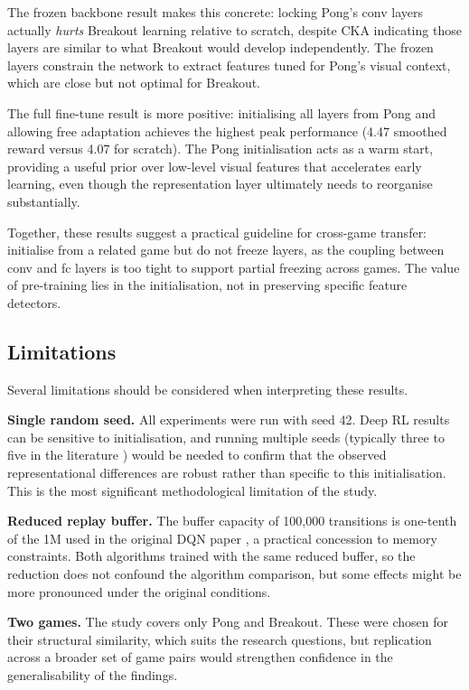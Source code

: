 \documentclass[a4paper]{article}
\begin{document}
The frozen backbone result makes this concrete: locking Pong's conv layers actually \textit{hurts} Breakout learning relative to scratch, despite CKA indicating those layers are similar to what Breakout would develop independently. The frozen layers constrain the network to extract features tuned for Pong's visual context, which are close but not optimal for Breakout.

The full fine-tune result is more positive: initialising all layers from Pong and allowing free adaptation achieves the highest peak performance (4.47 smoothed reward versus 4.07 for scratch). The Pong initialisation acts as a warm start, providing a useful prior over low-level visual features that accelerates early learning, even though the representation layer ultimately needs to reorganise substantially.

Together, these results suggest a practical guideline for cross-game transfer: initialise from a related game but do not freeze layers, as the coupling between conv and fc layers is too tight to support partial freezing across games. The value of pre-training lies in the initialisation, not in preserving specific feature detectors.

\subsection{Limitations}

Several limitations should be considered when interpreting these results.

\textbf{Single random seed.} All experiments were run with seed 42. Deep RL results can be sensitive to initialisation, and running multiple seeds (typically three to five in the literature \cite{henderson2018deep}) would be needed to confirm that the observed representational differences are robust rather than specific to this initialisation. This is the most significant methodological limitation of the study.

\textbf{Reduced replay buffer.} The buffer capacity of 100,000 transitions is one-tenth of the 1M used in the original DQN paper \cite{mnih2015human}, a practical concession to memory constraints. Both algorithms trained with the same reduced buffer, so the reduction does not confound the algorithm comparison, but some effects might be more pronounced under the original conditions.

\textbf{Two games.} The study covers only Pong and Breakout. These were chosen for their structural similarity, which suits the research questions, but replication across a broader set of game pairs would strengthen confidence in the generalisability of the findings.
\end{document}
